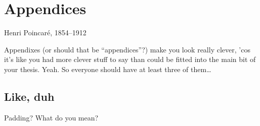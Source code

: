 \chapter{Appendices}
\label{app:Appendices}

%
{Henri Poincar\'e, 1854--1912}

Appendixes (or should that be ``appendices''?) make you look really clever, 'cos
it's like you had more clever stuff to say than could be fitted into the main
bit of your thesis. Yeah. So everyone should have at least three of them\dots

\section{Like, duh}
\label{sec:Duh}
Padding? What do you mean?

%
